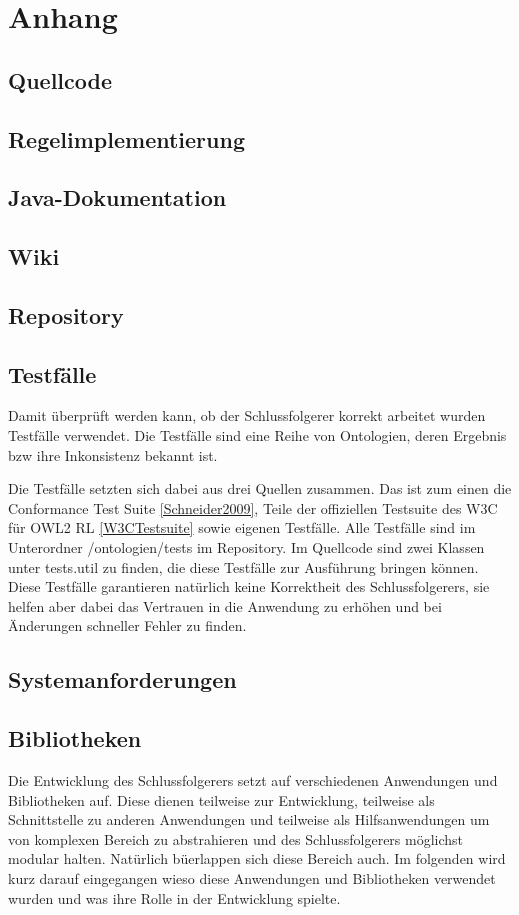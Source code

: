 \chapter{Anhang}
\section*{Quellcode}
\section*{Regelimplementierung}
\section*{Java-Dokumentation}
\section*{Wiki}
\section*{Repository}
\section*{Testfälle}
Damit überprüft werden kann, ob der Schlussfolgerer korrekt arbeitet wurden Testfälle verwendet. Die Testfälle sind eine Reihe von Ontologien, deren Ergebnis bzw ihre Inkonsistenz bekannt ist.

Die Testfälle setzten sich dabei aus drei Quellen zusammen. Das ist zum einen die Conformance Test Suite \ref{Schneider2009}, Teile der offiziellen Testsuite des W3C für OWL2 RL \ref{W3CTestsuite} sowie eigenen Testfälle. Alle Testfälle sind im Unterordner /ontologien/tests im Repository. Im Quellcode sind zwei Klassen unter tests.util zu finden, die diese Testfälle zur Ausführung bringen können. Diese Testfälle garantieren natürlich keine Korrektheit des Schlussfolgerers, sie helfen aber dabei das Vertrauen in die Anwendung zu erhöhen und bei Änderungen schneller Fehler zu finden.

\section*{Systemanforderungen}
\section*{Bibliotheken}
Die Entwicklung des Schlussfolgerers setzt auf verschiedenen Anwendungen und Bibliotheken auf. Diese dienen teilweise zur Entwicklung, teilweise als Schnittstelle zu anderen Anwendungen und teilweise als Hilfsanwendungen um von komplexen Bereich zu abstrahieren und des Schlussfolgerers möglichst modular halten. Natürlich büerlappen sich diese Bereich auch. Im folgenden wird kurz darauf eingegangen wieso diese Anwendungen und Bibliotheken verwendet wurden und was ihre Rolle in der Entwicklung spielte.

